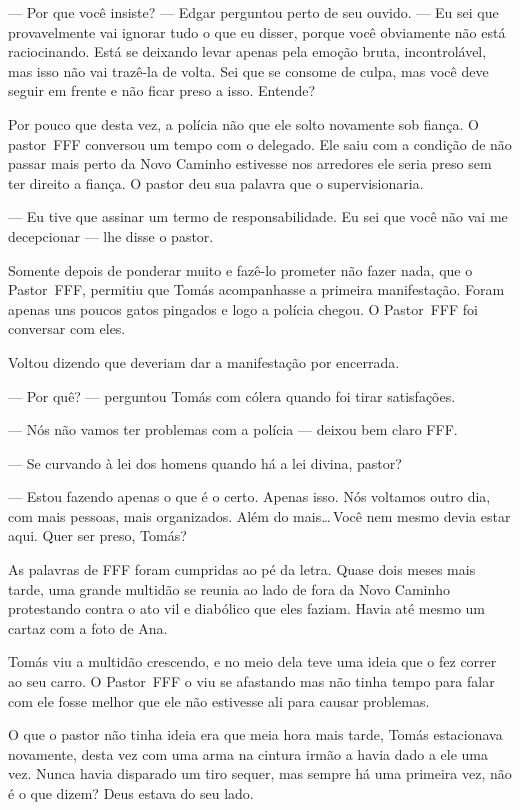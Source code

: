 --- Por que você insiste? ---  Edgar perguntou\mudanca{,} perto de seu ouvido. --- Eu sei que provavelmente vai ignorar tudo o que eu disser, porque você obviamente não está raciocinando. Está se deixando levar apenas pela emoção bruta, incontrolável, mas isso não vai trazê-la de volta. Sei que se consome de culpa, mas você deve seguir em frente e não ficar preso a isso. Entende?

Por pouco que\mudanca{,} desta vez, a polícia não  que ele  solto novamente sob fiança. O pastor~FFF conversou um tempo com o delegado. Ele saiu com a condição de não passar mais perto da Novo Caminho estivesse nos arredores\mudanca{,} ele seria preso sem ter direito a fiança. O pastor deu sua palavra que o supervisionaria.

--- Eu tive que assinar um termo de responsabilidade. Eu sei que você não vai me decepcionar --- lhe disse o pastor.

Somente depois de ponderar muito e fazê-lo prometer não fazer nada, que o Pastor~FFF, permitiu que Tomás acompanhasse a primeira manifestação. Foram apenas uns poucos gatos pingados e logo a polícia chegou. O Pastor~FFF foi conversar com eles.

Voltou dizendo que deveriam dar a manifestação por encerrada.

--- Por quê? ---  perguntou Tomás com cólera\mudanca{,} quando foi tirar satisfações.

--- Nós não vamos ter problemas com a polícia --- deixou bem claro FFF.

--- Se curvando à lei dos homens quando há a lei divina, pastor?

--- Estou fazendo apenas o que é o certo. Apenas isso. Nós voltamos outro dia, com mais pessoas, mais organizados. Além do mais\ldots\,Você nem mesmo devia estar aqui. Quer ser preso, Tomás?

As palavras de FFF foram cumpridas ao pé da letra. Quase dois meses mais tarde, uma grande multidão se reunia ao lado de fora da Novo Caminho protestando contra o ato vil e diabólico que eles faziam. Havia até mesmo um cartaz com a foto de Ana.

Tomás viu a multidão crescendo, e no meio dela teve uma ideia que o fez correr ao seu carro. O Pastor~FFF o viu se afastando\mudanca{,} mas não tinha tempo para falar com ele fosse melhor que ele não estivesse ali para causar problemas.

O que o pastor não tinha ideia era que\mudanca{,} meia hora mais tarde, Tomás estacionava novamente, desta vez com uma arma na cintura irmão a havia dado a ele uma vez. Nunca havia disparado um tiro sequer, mas sempre há uma primeira vez, não é o que dizem? Deus estava do seu lado.

